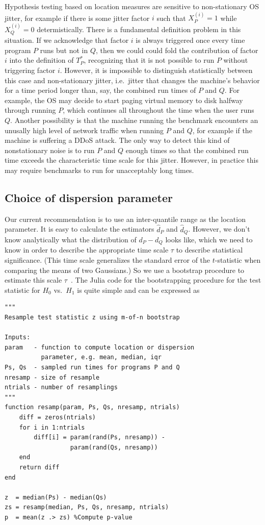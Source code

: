 \documentclass[conference]{IEEEtran}
\begin{document}
Hypothesis testing based on location measures are sensitive to non-stationary OS jitter, for example if there is some jitter factor $i$ such that $X^{(i)}_P = 1$ while $X^{(i)}_Q = 0$ determistically. There is a fundamental definition problem in this situation. If we acknowledge that factor $i$ is always triggered once every time program $P$ runs but not in $Q$, then we could could fold the contribution of factor $i$ into the definition of $T^*_P$, recognizing that it is not possible to run $P$ without triggering factor $i$. However, it is impossible to distinguish statistically between this case and non-stationary jitter, i.e.\ jitter that changes the machine's behavior for a time period longer than, say, the combined run times of $P$ and $Q$. For example, the OS may decide to start paging virtual memory to disk halfway through running $P$, which continues all throughout the time when the user runs $Q$. Another possibility is that the machine running the benchmark encounters an unusally high level of network traffic when running $P$ and $Q$, for example if the machine is suffering a DDoS attack. The only way to detect this kind of nonstationary noise is to run $P$ and $Q$ enough times so that the combined run time exceeds the characteristic time scale for this jitter. However, in practice this may require benchmarks to run for unacceptably long times.


\subsection{Choice of dispersion parameter}

Our current recommendation is to use an inter-quantile range as the location parameter. It is easy to calculate the estimators $\hat d_P$ and $\hat d_Q$. However, we don't know analytically what the distribution of $d_P - d_Q$ looks like, which we need to know in order to describe the appropriate time scale $\tau$ to describe statistical significance. (This time scale generalizes the standard error of the $t$-statistic when comparing the means of two Gaussians.) So we use a bootstrap procedure to estimate this scale $\tau$~\cite{Chernick2008}. The Julia code for the bootstrapping procedure for the test statistic for $H_0$ vs.\ $H_1$ is quite simple and can be expressed as

\begin{lstlisting}
"""
Resample test statistic z using m-of-n bootstrap

Inputs:
param   - function to compute location or dispersion
          parameter, e.g. mean, median, iqr
Ps, Qs  - sampled run times for programs P and Q
nresamp - size of resample
ntrials - number of resamplings
"""
function resamp(param, Ps, Qs, nresamp, ntrials)
    diff = zeros(ntrials)
    for i in 1:ntrials
        diff[i] = param(rand(Ps, nresamp)) -
                  param(rand(Qs, nresamp))
    end
    return diff
end

z  = median(Ps) - median(Qs)
zs = resamp(median, Ps, Qs, nresamp, ntrials)
p  = mean(z .> zs) %Compute p-value
\end{lstlisting}
\end{document}
